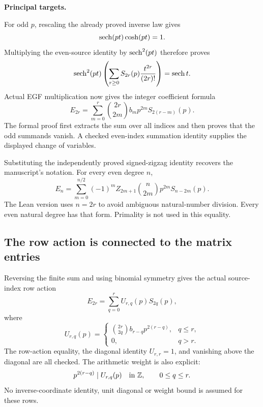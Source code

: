 \textbf{Principal targets.}\par
{}\par
{}
\par\medskip
{}
For odd $p$, rescaling the already proved inverse law gives
\[
 \operatorname{sech}(pt)\cosh(pt)=1.
\]
Multiplying the even-source identity by $\operatorname{sech}^2(pt)$ therefore proves
\[
 \operatorname{sech}^2(pt)\left(\sum_{r\ge0}S_{2r}(p)\frac{t^{2r}}{(2r)!}\right)=\operatorname{sech} t.
\]
Actual EGF multiplication now gives the integer coefficient formula
\[
 \boxed{E_{2r}=\sum_{m=0}^{r}\binom{2r}{2m}b_m p^{2m}S_{2(r-m)}(p).}
\]
The formal proof first extracts the sum over all indices and then proves that the odd summands vanish. A checked even-index summation identity supplies the displayed change of variables.

Substituting the independently proved signed-zigzag identity recovers the manuscript's notation. For every even degree $n$,
\[
 \boxed{E_n=\sum_{m=0}^{n/2}(-1)^m Z_{2m+1}\binom n{2m}p^{2m}S_{n-2m}(p).}
\]
The Lean version uses $n=2r$ to avoid ambiguous natural-number division. Every even natural degree has that form. Primality is not used in this equality.

\subsection*{The row action is connected to the matrix entries}
Reversing the finite sum and using binomial symmetry gives the actual source-index row action
\[
 E_{2r}=\sum_{q=0}^{r}U_{r,q}(p)S_{2q}(p),
\]
where
\[
 U_{r,q}(p)=
 \begin{cases}
 \displaystyle\binom{2r}{2q}b_{r-q}p^{2(r-q)},&q\le r,\\
 0,&q>r.
 \end{cases}
\]
The row-action equality, the diagonal identity $U_{r,r}=1$, and vanishing above the diagonal are all checked. The arithmetic weight is also explicit:
\[
 p^{2(r-q)}\mid U_{r,q}(p)\quad\text{in }\mathbb Z,\qquad 0\le q\le r.
\]
No inverse-coordinate identity, unit diagonal or weight bound is assumed for these rows.

